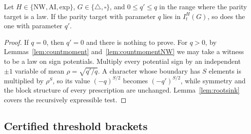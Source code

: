 \begin{lemma}\label{lem:paritymonotone}
Let $H\in\{\mathrm{NW},\mathrm{AI},\mathrm{exp}\}$, $G\in\{\triangle,\square\}$, and $0\le q'\le q$ in the range where the parity target is a law. If the parity target with parameter $q$ lies in $I^H_t(G)$, so does the one with parameter $q'$.
\end{lemma}

\begin{proof}
If $q=0$, then $q'=0$ and there is nothing to prove. For $q>0$, by Lemmas~\ref{lem:countmoment} and~\ref{lem:countmomentNW} we may take a witness to be a law on sign potentials. Multiply every potential sign by an independent $\pm1$ variable of mean $\rho=\sqrt{q'/q}$. A character whose boundary has $S$ elements is multiplied by $\rho^S$, so its value $(-q)^{S/2}$ becomes $(-q')^{S/2}$, while symmetry and the block structure of every prescription are unchanged. Lemma~\ref{lem:rootsink} covers the recursively expressible test.
\end{proof}


\subsection{Certified threshold brackets}\label{app:thresholds}

